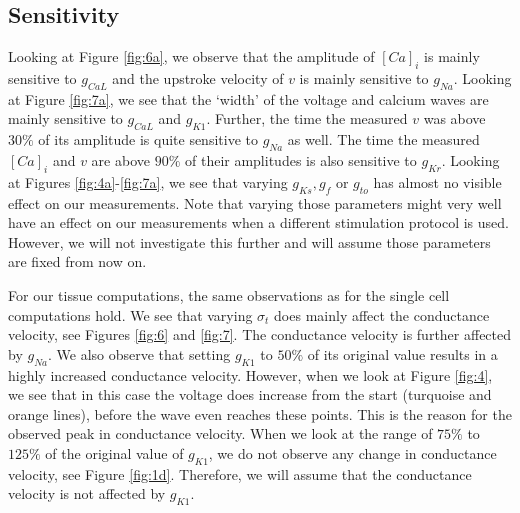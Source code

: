 \documentclass{article}
\begin{document}
\subsection{Sensitivity} \label{Sensitivity}
Looking at Figure \ref{fig:6a}, we observe that the amplitude of $[Ca]_i$ is mainly sensitive to $g_{CaL}$ and the upstroke velocity of $v$ is mainly sensitive to $g_{Na}$. Looking at Figure \ref{fig:7a}, we see that the `width' of the voltage and calcium waves are mainly sensitive to $g_{CaL}$ and $g_{K1}$. Further, the time the measured $v$ was above $30\%$ of its amplitude is quite sensitive to $g_{Na}$ as well. The time the measured $[Ca]_i$ and $v$ are above $90\%$ of their amplitudes is also sensitive to $g_{Kr}$. Looking at Figures \ref{fig:4a}-\ref{fig:7a}, we see that varying $g_{Ks}, g_{f}$ or $g_{to}$ has almost no visible effect on our measurements. Note that varying those parameters might very well have an effect on our measurements when a different stimulation protocol is used. However, we will not investigate this further and will assume those parameters are fixed from now on. 

For our tissue computations, the same observations as for the single cell computations hold. We see that varying $\sigma_t$ does mainly affect the conductance velocity, see Figures \ref{fig:6} and \ref{fig:7}. The conductance velocity is further affected by $g_{Na}$. We also observe that setting $g_{K1}$ to $50\%$ of its original value results in a highly increased conductance velocity. However, when we look at Figure \ref{fig:4}, we see that in this case the voltage does increase from the start (turquoise and orange lines), before the wave even reaches these points. This is the reason for the observed peak in conductance velocity. When we look at the range of $75\%$ to $125\%$ of the original value of $g_{K1}$, we do not observe any change in conductance velocity, see Figure \ref{fig:1d}. Therefore, we will assume that the conductance velocity is not affected by $g_{K1}$.
%
\end{document}
